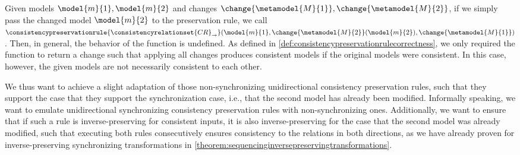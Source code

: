 Given models $\model{m}{1},\model{m}{2}$ and changes $\change{\metamodel{M}{1}},\change{\metamodel{M}{2}}$, if we simply pass the changed model $\model{m}{2}$ to the preservation rule, we call $\consistencypreservationrule{\consistencyrelationset{CR}_{\rightarrow}}(\model{m}{1},\change{\metamodel{M}{2}}(\model{m}{2}),\change{\metamodel{M}{1}})$.
Then, in general, the behavior of the function is undefined.
As defined in \autoref{def:consistencypreservationrulecorrectness}, we only required the function to return a change such that applying all changes produces consistent models if the original models were consistent.
In this case, however, the given models are not necessarily consistent to each other.

We thus want to achieve a slight adaptation of those non-synchronizing unidirectional consistency preservation rules, such that they support the case that they support the synchronization case, i.e., that the second model has already been modified.
Informally speaking, we want to emulate unidirectional synchronizing consistency preservation rules with non-synchronizing ones.
Additionally, we want to ensure that if such a rule is inverse-preserving for consistent inputs, it is also inverse-preserving for the case that the second model was already modified, such that executing both rules consecutively ensures consistency to the relations in both directions, as we have already proven for inverse-preserving synchronizing transformations in \autoref{theorem:sequencinginversepreservingtransformations}.

